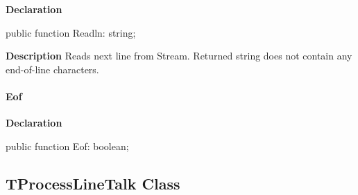 \documentclass{report}
\newif\ifpdf
\begin{document}
\label{PasDoc_ProcessLineTalk.TTextReader-Readln}
\begin{list}{}{
\setlength{\itemindent}{0cm}
\setlength{\listparindent}{0cm}
\setlength{\leftmargin}{\evensidemargin}
\addtolength{\leftmargin}{\tmplength}
\settowidth{\labelsep}{X}
\addtolength{\leftmargin}{\labelsep}
\setlength{\labelwidth}{\tmplength}
}
\item[\textbf{Declaration}\hfill]
\ifpdf
\begin{flushleft}
\fi
\begin{ttfamily}
public function Readln: string;\end{ttfamily}

\ifpdf
\end{flushleft}
\fi

\par
\item[\textbf{Description}]
Reads next line from Stream. Returned string does not contain any end{-}of{-}line characters.

\end{list}
\paragraph*{Eof}\hspace*{\fill}

\label{PasDoc_ProcessLineTalk.TTextReader-Eof}
\begin{list}{}{
\setlength{\itemindent}{0cm}
\setlength{\listparindent}{0cm}
\setlength{\leftmargin}{\evensidemargin}
\addtolength{\leftmargin}{\tmplength}
\settowidth{\labelsep}{X}
\addtolength{\leftmargin}{\labelsep}
\setlength{\labelwidth}{\tmplength}
}
\item[\textbf{Declaration}\hfill]
\ifpdf
\begin{flushleft}
\fi
\begin{ttfamily}
public function Eof: boolean;\end{ttfamily}

\ifpdf
\end{flushleft}
\fi

\end{list}
\ifpdf
\subsection*{\large{\textbf{TProcessLineTalk Class}}\normalsize\hspace{1ex}\hrulefill}
\else
\end{document}
